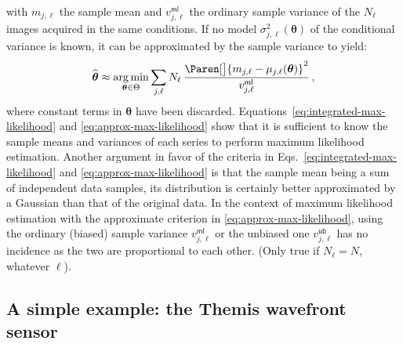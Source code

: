 \documentclass[a4paper,11pt,twoside]{scrartcl}
\newcommand{\oops}[1]{\textcolor[named]{BrickRed}{#1}}
\DeclareMathOperator*{\argmin}{arg\,min}
\newcommand*{\Tag}[1]{\mathsf{#1}}
\newcommand*{\estim}[1]{\widehat{#1}}
\newcommand*{\V}[1]{\boldsymbol{#1}}   %
\theoremstyle{plain} %
\theoremstyle{definition}
\theoremstyle{remark}
\begin{document}
with $m_{j,\ell}$ the sample mean and $v_{j,\ell}^\Tag{ml}$ the ordinary sample
variance of the $N_\ell$ images acquired in the same conditions. If no model
$\sigma_{j,\ell}^2(\V\theta)$ of the conditional variance is known, it can be
approximated by the sample variance to yield:
\begin{equation}
  \estim{\V\theta}
  \approx \argmin_{\V\theta \in \Theta} \sum_{j,\ell} N_\ell\,
  \frac{
    \Paren[\big]{m_{j,\ell} - \mu_{j,\ell}(\V\theta)}^2
  }{
    v_{j,\ell}^\Tag{ml}
  } \, ,
  \label{eq:approx-max-likelihood}
\end{equation}
where constant terms in $\V\theta$ have been discarded.
Equations~\eqref{eq:integrated-max-likelihood} and
\eqref{eq:approx-max-likelihood} show that it is sufficient to know the sample
means and variances of each series to perform maximum likelihood estimation.
Another argument in favor of the criteria in
Eqs.~\eqref{eq:integrated-max-likelihood} and \eqref{eq:approx-max-likelihood}
is that the sample mean being a sum of independent data samples, its
distribution is certainly better approximated by a Gaussian than that of the
original data. In the context of maximum likelihood estimation with the
approximate criterion in \eqref{eq:approx-max-likelihood}, using the ordinary
(biased) sample variance $v_{j,\ell}^\Tag{ml}$ or the unbiased one
$v_{j,\ell}^\Tag{ub}$ has no incidence as the two are proportional to each
other.  \oops{(Only true if $N_\ell = N$, whatever $\ell$)}.


\subsection{A simple example: the Themis wavefront sensor}
\end{document}

